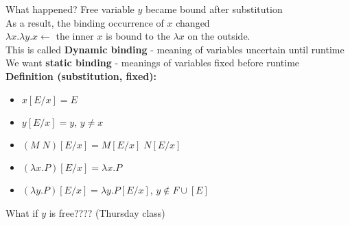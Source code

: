 \documentclass[11pt]{article}
\begin{document}
What happened? Free variable $y$ became bound after substitution \\

As a result, the binding occurrence of $x$ changed \\

$\lambda x.\lambda y.x \leftarrow$ the inner $x$ is bound to the $\lambda x$ on the outside. \\

This is called {\bf Dynamic binding} - meaning of variables uncertain until runtime \\

We want {\bf static binding} - meanings of variables fixed before runtime \\

\textbf{Definition (substitution, fixed):}
\begin{itemize}
	\item[] $x[E/x] = E$
	\item[] $y[E/x] = y$, $y \neq x$
	\item[] $(M\;N)[E/x] = M[E/x]\;N[E/x]$
	\item[] $(\lambda x.P)[E/x] = \lambda x.P$
	\item[] $(\lambda y.P)[E/x] = \lambda y. P[E/x]$, $y \notin F \cup [E]$
\end{itemize}

What if $y$ is free???? (Thursday class)
\end{document}
